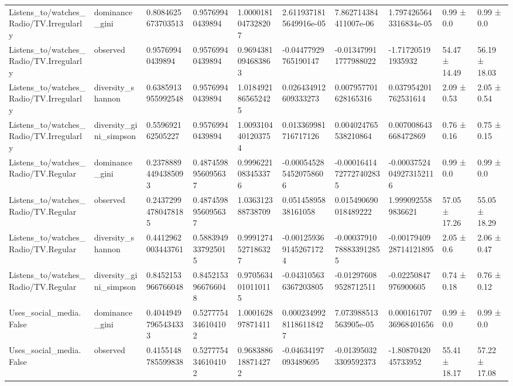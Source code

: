 \begin{longtable}{llllllllll}
Listens\_to/watches\_Radio/TV.Irregularly & dominance\_gini & 0.8084625673703513 & 0.95769940439894 & 1.0000181047328207 & 2.6119371815649916e-05 & 7.862714384411007e-06 & 1.7974265643316834e-05 & 0.99 ± 0.0 & 0.99 ± 0.0 \\
Listens\_to/watches\_Radio/TV.Irregularly & observed & 0.95769940439894 & 0.95769940439894 & 0.9694381094683863 & -0.04477929765190147 & -0.013479911777988022 & -1.717205191935932 & 54.47 ± 14.49 & 56.19 ± 18.03 \\
Listens\_to/watches\_Radio/TV.Irregularly & diversity\_shannon & 0.6385913955992548 & 0.95769940439894 & 1.0184921865652425 & 0.026434912609333273 & 0.007957701628165316 & 0.037954201762531614 & 2.09 ± 0.53 & 2.05 ± 0.54 \\
Listens\_to/watches\_Radio/TV.Irregularly & diversity\_gini\_simpson & 0.559692162505227 & 0.95769940439894 & 1.0093104401203754 & 0.013369981716717126 & 0.004024765538210864 & 0.007008643668472869 & 0.76 ± 0.16 & 0.75 ± 0.15 \\
Listens\_to/watches\_Radio/TV.Regular & dominance\_gini & 0.23788894494385093 & 0.4874598956095637 & 0.9996221083453376 & -0.0005452854520758606 & -0.00016414727727402835 & -0.00037524049273152116 & 0.99 ± 0.0 & 0.99 ± 0.0 \\
Listens\_to/watches\_Radio/TV.Regular & observed & 0.24372994780478185 & 0.4874598956095637 & 1.036312388738709 & 0.05145895838161058 & 0.015490690018489222 & 1.9990925589836621 & 57.05 ± 17.26 & 55.05 ± 18.29 \\
Listens\_to/watches\_Radio/TV.Regular & diversity\_shannon & 0.4412962003443761 & 0.5883949337925015 & 0.9991274527186327 & -0.0012593691452671724 & -0.00037910788833912855 & -0.0017940928714121895 & 2.05 ± 0.6 & 2.06 ± 0.47 \\
Listens\_to/watches\_Radio/TV.Regular & diversity\_gini\_simpson & 0.8452153966766048 & 0.8452153966766048 & 0.9705634010110115 & -0.043105636367203805 & -0.012976089528712511 & -0.02250847976900605 & 0.74 ± 0.18 & 0.76 ± 0.12 \\
Uses\_social\_media.False & dominance\_gini & 0.40449497965434333 & 0.5277754346104102 & 1.000162897871411 & 0.00023499281186118427 & 7.073988513563905e-05 & 0.00016170736968401656 & 0.99 ± 0.0 & 0.99 ± 0.0 \\
Uses\_social\_media.False & observed & 0.4155148785599838 & 0.5277754346104102 & 0.9683886188714272 & -0.04634197093489695 & -0.013950323309592373 & -1.8087042045733952 & 55.41 ± 18.17 & 57.22 ± 17.08 \\

\end{longtable}
